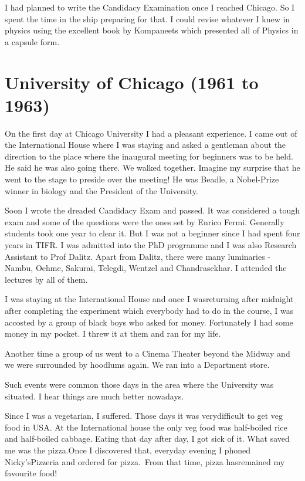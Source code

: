I had planned to write the Candidacy Examination once I reached Chicago. 
So I spent the time in the ship preparing for that. I could revise 
whatever I knew in physics using the excellent book by Kompaneets which 
presented all of Physics in a capsule form.

\section*{University of Chicago (1961 to 1963)}

On the first day at Chicago University I had a pleasant experience. I 
came out of the International House where I was staying and asked a 
gentleman about the direction to the place where the inaugural meeting 
for beginners was to be held. He said he was also going there. We walked 
together. Imagine my surprise that he went to the stage to preside over 
the meeting! He was Beadle, a Nobel-Prize winner in biology and the 
President of the University.
    
Soon I wrote the dreaded Candidacy Exam and passed. It was considered a 
tough exam and some of the questions were the ones set by Enrico Fermi. 
Generally students took one year to clear it. But I was not a beginner 
since I had spent four years in TIFR. I was admitted into the PhD 
programme and I was also Research Assistant to Prof Dalitz. Apart from 
Dalitz, there were many luminaries - Nambu, Oehme, Sakurai, Telegdi, 
Wentzel and Chandrasekhar. I attended the lectures by all of them.

I was staying at the International House and once I was\break returning after 
midnight after completing the experiment which everybody had to do in 
the course, I was accosted by a group of black boys who asked for money. 
Fortunately I had some money in my pocket. I threw it at them and ran 
for my life.

Another time a group of us went to a Cinema Theater beyond the Midway 
and we were surrounded by hoodlums again. We ran into a Department 
store.

Such events were common those days in the area where the University was 
situated. I hear things are much better nowadays.

Since I was a vegetarian, I suffered. Those days it was very\break difficult 
to get veg food in USA. At the International house the only veg food was 
half-boiled rice and half-boiled cabbage. Eating that day after day, I 
got sick of it. What saved me was the pizza.\break Once I discovered that, 
everyday evening I phoned Nicky's\break Pizzeria and ordered for pizza.\ From 
that time, pizza has\break remained my favourite food!
 
